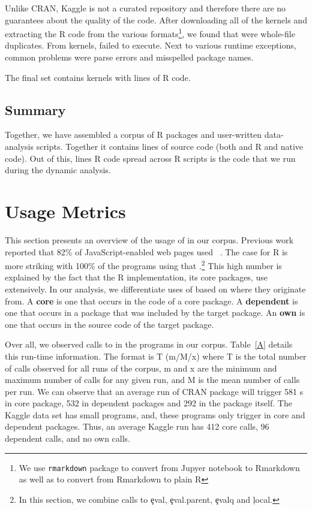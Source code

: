 \documentclass[conference]{IEEEtran}
\begin{document}
Unlike CRAN, Kaggle is not a curated repository and therefore there are no
guarantees about the quality of the code. After downloading all of the
\CorpusKaggle kernels and extracting the R code from the various
formats\footnote{We use \texttt{rmarkdown} package to convert from Jupyer
  notebook to Rmarkdown as well as to convert from Rmarkdown to plain R}, we
found that \CorpusDuplicatedKaggle were whole-file duplicates. From
\CorpusRunnableKaggle kernels, \CorpusFailedKaggle failed to execute. Next to
various runtime exceptions, common problems were parse errors and misspelled
package names.

The final set contains \CorpusFinishedKaggle kernels with
\CorpusFinishedKaggleCodeRnd {} lines of R
code.

\subsection{Summary}

Together, we have assembled a corpus of \CorpusPackages R packages and
\CorpusFinishedKaggle user-written data-analysis scripts. Together it contains
\CorpusAllCodeRnd lines of source code (both and R and native code). Out of
this, \CorpusAllRunnbaleCode lines R code spread across \CorpusAllPrograms R
scripts is the code that we run during the dynamic analysis.

\section{Usage Metrics}

This section presents an overview of the usage of \eval in our corpus.
Previous work reported that 82\% of JavaScript-enabled web pages used
\eval~\cite{ecoop11}. The case for R is more striking with 100\% of the
programs using that \eval.\footnote{In this section, we combine calls to
  \c{eval}, \c{eval.parent}, \c{evalq} and \c{local}.}  This high number is
explained by the fact that the R implementation, its core packages, use
\eval extensively. In our analysis, we differentiate uses of \eval based on
where they originate from. A {\bf core} \eval is one that occurs in the code
of a core package.  A {\bf dependent} \eval is one that occurs in a package
that was included by the target package. An {\bf own} \eval is one that
occurs in the source code of the target package.

Over all, we observed \AllAllCallCountRnd calls to \eval in the
\CorpusAllProgramsRnd programs in our corpus.  Table~\ref{A} details this
run-time information. The format is T (m/M/x) where T is the total number of
calls observed for all runs of the corpus, m and x are the minimum and
maximum number of calls for any given run, and M is the mean number of calls
per run. We can observe that an average run of CRAN package will trigger 581
{\eval}s in core package, 532 in dependent packages and 292 in the package
itself.  The Kaggle data set has small programs, and, these programs only
trigger \eval in core and dependent packages. Thus, an average Kaggle run
has 412 core calls, 96 dependent calls, and no own calls.
\end{document}
